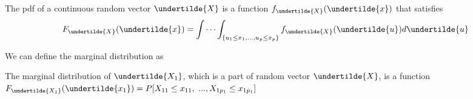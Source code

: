 \documentclass[../MultivariateProbabilityAndRelatedProperties.tex]{subfiles}
\begin{document}
\begin{definition}
	The pdf of a continuous random vector $\undertilde{X}$ is a function $f_{\undertilde{X}}(\undertilde{x})$ that satisfies
	$$F_{\undertilde{X}}(\undertilde{x}) = \int\cdots\int_{\{u_1\leq x_1,...,u_p\leq x_p \}}f_{\undertilde{X}}(\undertilde{u})d\undertilde{u}$$
\end{definition}

We can define the marginal distribution as
\begin{definition}
	The marginal distribution of $\undertilde{X_1}$, which is a part of random vector $\undertilde{X}$, is a function $F_{\undertilde{X_1}}(\undertilde{x_1}) = P[X_{11}\leq x_{11},\ ...,X_{1p_1}\leq x_{1p_1}]$
\end{definition}
\end{document}
